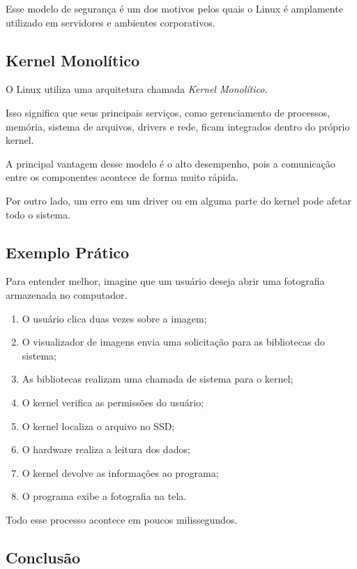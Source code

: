 \documentclass{article}
\begin{document}
Esse modelo de segurança é um dos motivos pelos quais o Linux é amplamente utilizado em servidores e ambientes corporativos.

\subsection{Kernel Monolítico}

O Linux utiliza uma arquitetura chamada \textit{Kernel Monolítico}.

Isso significa que seus principais serviços, como gerenciamento de processos, memória, sistema de arquivos, drivers e rede, ficam integrados dentro do próprio kernel.

A principal vantagem desse modelo é o alto desempenho, pois a comunicação entre os componentes acontece de forma muito rápida.

Por outro lado, um erro em um driver ou em alguma parte do kernel pode afetar todo o sistema.

\subsection{Exemplo Prático}

Para entender melhor, imagine que um usuário deseja abrir uma fotografia armazenada no computador.

\begin{enumerate}
\item O usuário clica duas vezes sobre a imagem;
\item O visualizador de imagens envia uma solicitação para as bibliotecas do sistema;
\item As bibliotecas realizam uma chamada de sistema para o kernel;
\item O kernel verifica as permissões do usuário;
\item O kernel localiza o arquivo no SSD;
\item O hardware realiza a leitura dos dados;
\item O kernel devolve as informações ao programa;
\item O programa exibe a fotografia na tela.
\end{enumerate}

Todo esse processo acontece em poucos milissegundos.

\subsection{Conclusão}
\end{document}
